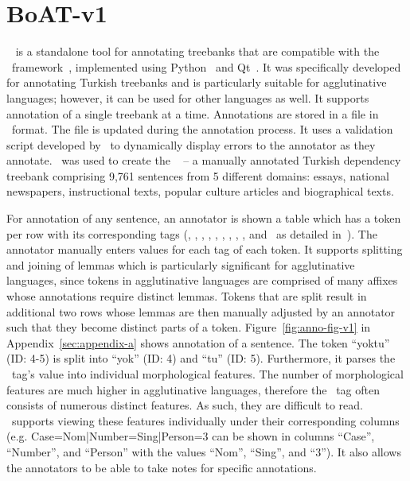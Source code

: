 \section{BoAT-v1}
\label{sec:boatvone}

\boatvone~\cite{turk-2021-boat} is a standalone tool for annotating treebanks that are compatible with the \ud\ framework~\cite{UD}, implemented using Python~\cite{python} and Qt~\cite{qt}.
It was specifically developed for annotating Turkish treebanks and is particularly suitable for agglutinative languages; however, it can be used for other languages as well.
It supports annotation of a single treebank at a time.
Annotations are stored in a file in \conllu\ format.
The file is updated during the annotation process.
It uses a validation script developed by \ud\ to dynamically display errors to the annotator as they annotate.
\boatvone\ was used to create the \bountreebank~\cite{ud-boun-treebank} -- a manually annotated Turkish dependency treebank comprising 9,761 sentences from 5 different domains: essays, national newspapers, instructional texts, popular culture articles and biographical texts.

For annotation of any sentence, an annotator is shown a table which has a token per row with its corresponding tags (\id, \form, \udlemma, \upos, \xpos, \feats, \head, \deprel, \deps, and \misc\ as detailed in~\cite{turk-2021-boat}).
The annotator manually enters values for each tag of each token.
It supports splitting and joining of lemmas which is particularly significant for agglutinative languages, since tokens in agglutinative languages are comprised of many affixes whose annotations require distinct lemmas.
Tokens that are split result in additional two rows whose lemmas are then manually adjusted by an annotator such that they become distinct parts of a token.
Figure~\ref{fig:anno-fig-v1} in Appendix~\ref{sec:appendix-a} shows annotation of a sentence.
The token ``yoktu'' (ID: 4-5) is split into ``yok'' (ID: 4) and ``tu'' (ID: 5). 
Furthermore, it parses the \feats\ tag's value into individual morphological features.
The number of morphological features are much higher in agglutinative languages, therefore the \feats\ tag often consists of numerous distinct features.
As such, they are difficult to read.
\boatvone\ supports viewing these features individually under their corresponding columns (e.g. Case=Nom|Number=Sing|Person=3 can be shown in columns ``Case'', ``Number'', and ``Person'' with the values ``Nom'', ``Sing'', and ``3'').
It also allows the annotators to be able to take notes for specific annotations.
